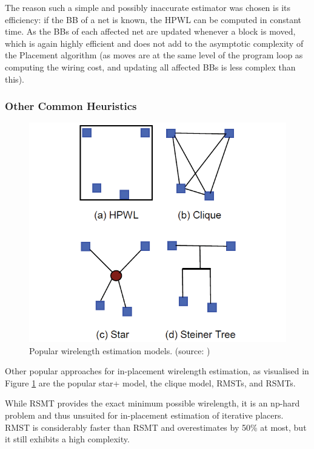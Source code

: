 The reason such a simple and possibly inaccurate estimator was chosen is its efficiency: if the \gls{BB} of a net is known, the \gls{HPWL} can be computed in constant time. As the \glspl{BB} of each affected net are updated whenever a block is moved, which is again highly efficient and does not add to the asymptotic complexity of the Placement algorithm (as moves are at the same level of the program loop as computing the wiring cost, and updating all affected \glspl{BB} is less complex than this).

\subsubsection{Other Common Heuristics}

\begin{figure}
	\includegraphics[width=\textwidth]{plots/wirelength-estimation-models.png}
	\caption{Popular wirelength estimation models. (source: \cite{star-plus-paper})}
	\label{fig:wirelength-estimation-models}
\end{figure}

Other popular approaches for in-placement wirelength estimation, as visualised in Figure \ref{fig:wirelength-estimation-models} are the popular star+ model, the clique model, \glspl{RMST}, and \glspl{RSMT}.\cite{star-plus-paper}

While \gls{RSMT} provides the exact minimum possible wirelength, it is an np-hard problem and thus unsuited for in-placement estimation of iterative placers. \gls{RMST} is considerably faster than \gls{RSMT} and overestimates by 50\% at most\cite{rmst-quality}, but it still exhibits a high complexity.

